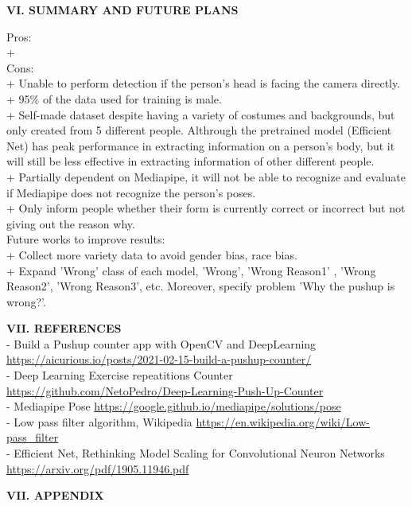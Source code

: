 \documentclass[12pt,a4paper,twoside]{article}
\begin{document}
	\begin{flushleft}
		\textbf{VI. SUMMARY AND FUTURE PLANS}
		\begin{flushleft}
		Pros:\\
		+\\
		Cons:\\
		+ Unable to perform detection if the person's head is facing the camera directly.\\
		+ 95\% of the data used for training is male.\\
		+ Self-made dataset despite having a variety of costumes and backgrounds, but only created from 5 different people. Althrough the pretrained model (Efficient Net) has peak performance in extracting information on a person's body, but it will still be less effective in extracting information of other different people.\\
		+ Partially dependent on Mediapipe, it will not be able to recognize and evaluate if Mediapipe does not recognize the person's poses.\\
		+ Only inform people whether their form is currently correct or incorrect but not giving out the reason why.\\
		\bigskip
		Future works to improve results:\\
		+ Collect more variety data to avoid gender bias, race bias.\\
		+ Expand 'Wrong' class of each model, 'Wrong', 'Wrong Reason1' , 'Wrong Reason2', 'Wrong Reason3', etc. Moreover, specify problem 'Why the pushup is wrong?'.\\
		\end{flushleft}
	\end{flushleft}
	\bigskip
	\begin{flushleft}
		\textbf{VII. REFERENCES}\\
		\medskip
		- Build a Pushup counter app with OpenCV and DeepLearning
		\url{https://aicurious.io/posts/2021-02-15-build-a-pushup-counter/}\\
		\medskip
		- Deep Learning Exercise repeatitions Counter
		\url{https://github.com/NetoPedro/Deep-Learning-Push-Up-Counter}\\
		\medskip
		- Mediapipe Pose
		\url{https://google.github.io/mediapipe/solutions/pose}\\
		\medskip
		- Low pass filter algorithm, Wikipedia
		\url{https://en.wikipedia.org/wiki/Low-pass_filter}\\
		\medskip
		- Efficient Net, Rethinking Model Scaling for Convolutional Neuron Networks
		\url{https://arxiv.org/pdf/1905.11946.pdf}
	\end{flushleft}
	\bigskip
	\begin{flushleft}
		\textbf{VII. APPENDIX}
	\end{flushleft}
\end{document}
